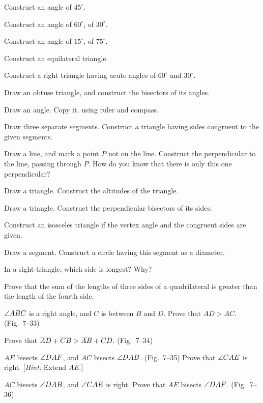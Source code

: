 \documentclass[11pt]{book}
\begin{document}
\begin{exlist}
\item Construct an angle of $45^\circ$.
\item Construct an angle of $60^\circ$, of $30^\circ$.
\item Construct an angle of $15^\circ$, of $75^\circ$.
\item Construct an equilateral triangle.
\item Construct a right triangle having acute angles of $60^\circ$ and
  $30^\circ$.
\item Draw an obtuse triangle, and construct the bisectors of its angles.
\item Draw an angle. Copy it, using ruler and compass.
\item Draw three separate segments. Construct a triangle having sides congruent
  to the given segments.
\item Draw a line, and mark a point $P$ not on the line. Construct the
  perpendicular to the line, passing through $P$. How do you know that there is
  only this one perpendicular?
\item Draw a triangle. Construct the altitudes of the triangle.
\item Draw a triangle. Construct the perpendicular bisectors of its sides.
\item Construct an isosceles triangle if the vertex angle and the congruent
  sides are given.
\item Draw a segment. Construct a circle having this segment as a diameter.
\item In a right triangle, which side is longest? Why?
\item Prove that the sum of the lengths of three sides of a quadrilateral is
  greater than the length of the fourth side.
\item $\angle ABC$ is a right angle, and $C$ is between $B$ and $D$. Prove that
  $AD > AC$. (Fig.~7--33)
\exfig{\FIGVIITHIRTYTHREE}
\item Prove that $\overline{AD} + \overline{CB} > \overline{AB} + \overline{CD}$. (Fig.~7--34)
\exfig{\FIGVIITHIRTYFOUR}
\item $AE$ bisects $\angle DAF$, and $AC$ bisects $\angle DAB$. (Fig.~7--35)
  Prove that $\angle CAE$ is right. [\emph{Hint:} Extend $AE$.]
\exfig{\FIGVIITHIRTYFIVE}
\item $AC$ bisects $\angle DAB$, and $\angle CAE$ is right. Prove that $AE$
  bisects $\angle DAF$. (Fig.~7--36)
\exfig{\FIGVIITHIRTYSIX}
\end{exlist}
\end{document}
